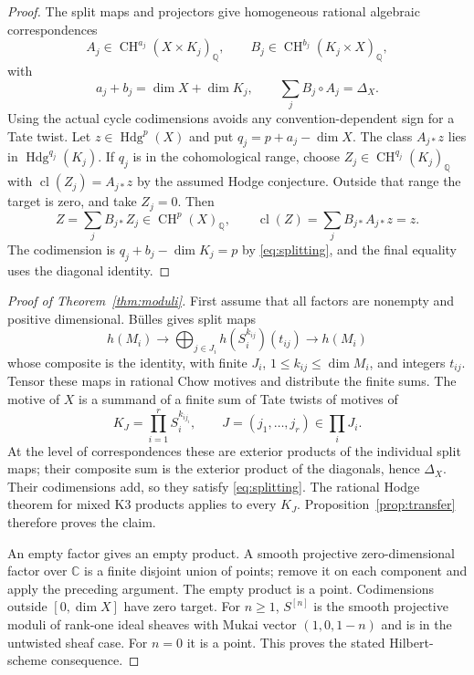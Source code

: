 \documentclass[11pt]{article}
\newcommand{\Q}{\mathbb Q}
\newcommand{\CH}{\operatorname{CH}}
\newcommand{\Hdg}{\operatorname{Hdg}}
\newcommand{\cl}{\operatorname{cl}}
\begin{document}
\begin{proof}
The split maps and projectors give homogeneous rational algebraic
correspondences
\[
 A_j\in\CH^{a_j}(X\times K_j)_\Q,\qquad
 B_j\in\CH^{b_j}(K_j\times X)_\Q,
\]
with
\begin{equation}\label{eq:splitting}
 a_j+b_j=\dim X+\dim K_j,\qquad
 \sum_j B_j\circ A_j=\Delta_X.
\end{equation}
Using the actual cycle codimensions avoids any convention-dependent
sign for a Tate twist.
Let $z\in\Hdg^p(X)$ and put $q_j=p+a_j-\dim X$. The class $A_{j*}z$
lies in $\Hdg^{q_j}(K_j)$. If $q_j$ is in the cohomological range,
choose $Z_j\in\CH^{q_j}(K_j)_\Q$ with
$\cl(Z_j)=A_{j*}z$ by the assumed Hodge conjecture. Outside that range
the target is zero, and take $Z_j=0$. Then
\[
 Z=\sum_j B_{j*}Z_j\in\CH^p(X)_\Q,
 \qquad
 \cl(Z)=\sum_j B_{j*}A_{j*}z=z.
\]
The codimension is $q_j+b_j-\dim K_j=p$ by
\eqref{eq:splitting}, and the final equality uses the diagonal identity.
\end{proof}

\begin{proof}[Proof of Theorem~\ref{thm:moduli}]
First assume that all factors are nonempty and positive dimensional.
B\"ulles gives split maps
\[
 h(M_i)\longrightarrow
   \bigoplus_{j\in J_i}h(S_i^{k_{ij}})(t_{ij})
   \longrightarrow h(M_i)
\]
whose composite is the identity, with finite $J_i$,
$1\leq k_{ij}\leq\dim M_i$, and integers $t_{ij}$. Tensor these maps
in rational Chow motives and distribute the finite sums. The motive of
$X$ is a summand of a finite sum of Tate twists of motives of
\[
 K_J=\prod_{i=1}^r S_i^{k_{ij_i}},
 \qquad J=(j_1,\ldots,j_r)\in\prod_i J_i.
\]
At the level of correspondences these are exterior products of the
individual split maps; their composite sum is the exterior product of
the diagonals, hence $\Delta_X$. Their codimensions add, so they satisfy
\eqref{eq:splitting}. The rational Hodge theorem for mixed K3 products
\cite{OpenAIMixed} applies to every $K_J$. Proposition~\ref{prop:transfer}
therefore proves the claim.

An empty factor gives an empty product. A smooth projective
zero-dimensional factor over $\mathbb C$ is a finite disjoint union of
points; remove it on each component and apply the preceding argument.
The empty product is a point. Codimensions outside $[0,\dim X]$ have
zero target.
For $n\geq1$, $S^{[n]}$ is the smooth projective moduli of rank-one ideal
sheaves with Mukai vector $(1,0,1-n)$ and is in the untwisted sheaf case.
For $n=0$ it is a point. This proves the stated Hilbert-scheme consequence.
\end{proof}
\end{document}

